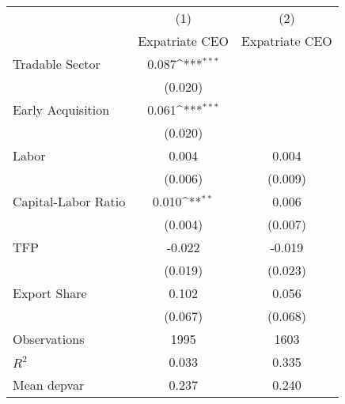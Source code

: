 {
\def\sym#1{\ifmmode^{#1}\else\(^{#1}\)\fi}
\begin{tabular}{l*{2}{c}}
\hline\hline
                    &\multicolumn{1}{c}{(1)}&\multicolumn{1}{c}{(2)}\\
                    &\multicolumn{1}{c}{Expatriate CEO}&\multicolumn{1}{c}{Expatriate CEO}\\
\hline
Tradable Sector     &       0.087\sym{***}&                     \\
                    &     (0.020)         &                     \\
[1em]
Early Acquisition   &       0.061\sym{***}&                     \\
                    &     (0.020)         &                     \\
[1em]
Labor               &       0.004         &       0.004         \\
                    &     (0.006)         &     (0.009)         \\
[1em]
Capital-Labor Ratio &       0.010\sym{**} &       0.006         \\
                    &     (0.004)         &     (0.007)         \\
[1em]
TFP                 &      -0.022         &      -0.019         \\
                    &     (0.019)         &     (0.023)         \\
[1em]
Export Share        &       0.102         &       0.056         \\
                    &     (0.067)         &     (0.068)         \\
\hline
Observations        &        1995         &        1603         \\
\(R^{2}\)           &       0.033         &       0.335         \\
Mean depvar         &       0.237         &       0.240         \\
\hline\hline
\end{tabular}
}
